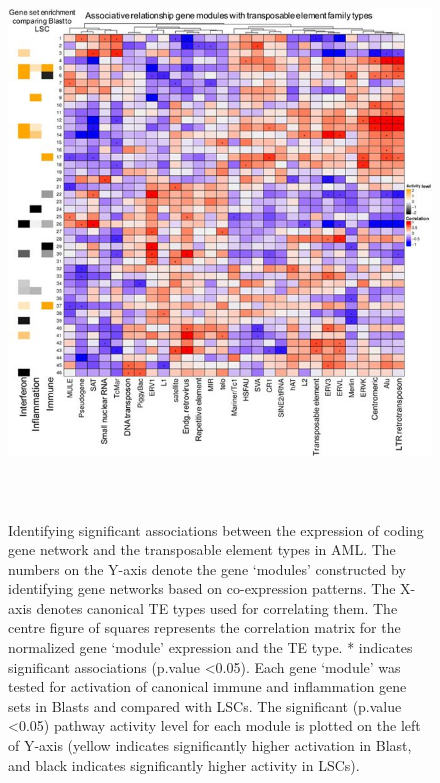 \begin{figure}
    \centering
    \includegraphics[height = 15cm, width = 15cm]{tex/tes/41598_2017_7356_Fig4_HTML.jpg}
    \caption{Identifying significant associations between the expression of coding gene network and the transposable element types in AML.  The numbers on the Y-axis denote the gene `modules' constructed by identifying gene networks based on co-expression patterns.  The X-axis denotes canonical TE types used for correlating them. The centre  figure of squares represents the correlation matrix for the normalized gene `module' expression and the TE type. * indicates significant associations (p.value \textless 0.05). Each gene `module' was tested for activation of canonical immune and inflammation gene sets in Blasts and compared with LSCs.  The significant (p.value \textless 0.05) pathway activity level for each module is plotted on the left  of Y-axis (yellow indicates significantly higher activation in Blast, and black indicates significantly higher activity in LSCs).}
    \label{fig:tes4}
\end{figure}



